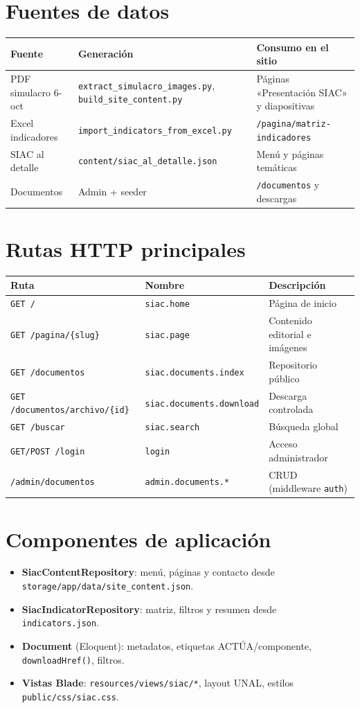 \section{Fuentes de datos}
\begin{longtable}{@{}p{3.2cm}p{4.2cm}p{5.5cm}@{}}
\toprule
\textbf{Fuente} & \textbf{Generación} & \textbf{Consumo en el sitio} \\
\midrule
\endhead
PDF simulacro 6-oct &
\texttt{extract\_simulacro\_images.py}, \texttt{build\_site\_content.py} &
Páginas «Presentación SIAC» y diapositivas \\
Excel indicadores &
\texttt{import\_indicators\_from\_excel.py} &
\texttt{/pagina/matriz-indicadores} \\
SIAC al detalle &
\texttt{content/siac\_al\_detalle.json} &
Menú y páginas temáticas \\
Documentos &
Admin + seeder &
\texttt{/documentos} y descargas \\
\bottomrule
\end{longtable}

\section{Rutas HTTP principales}
\begin{longtable}{@{}p{4.5cm}p{3.2cm}p{5.5cm}@{}}
\toprule
\textbf{Ruta} & \textbf{Nombre} & \textbf{Descripción} \\
\midrule
\endhead
\texttt{GET /} & \texttt{siac.home} & Página de inicio \\
\texttt{GET /pagina/\{slug\}} & \texttt{siac.page} & Contenido editorial e imágenes \\
\texttt{GET /documentos} & \texttt{siac.documents.index} & Repositorio público \\
\texttt{GET /documentos/archivo/\{id\}} & \texttt{siac.documents.download} & Descarga controlada \\
\texttt{GET /buscar} & \texttt{siac.search} & Búsqueda global \\
\texttt{GET/POST /login} & \texttt{login} & Acceso administrador \\
\texttt{/admin/documentos} & \texttt{admin.documents.*} & CRUD (middleware \texttt{auth}) \\
\bottomrule
\end{longtable}

\section{Componentes de aplicación}
\begin{itemize}
  \item \textbf{SiacContentRepository}: menú, páginas y contacto desde \texttt{storage/app/data/site\_content.json}.
  \item \textbf{SiacIndicatorRepository}: matriz, filtros y resumen desde \texttt{indicators.json}.
  \item \textbf{Document} (Eloquent): metadatos, etiquetas ACTÚA/componente, \texttt{downloadHref()}, filtros.
  \item \textbf{Vistas Blade}: \texttt{resources/views/siac/*}, layout UNAL, estilos \texttt{public/css/siac.css}.
\end{itemize}

